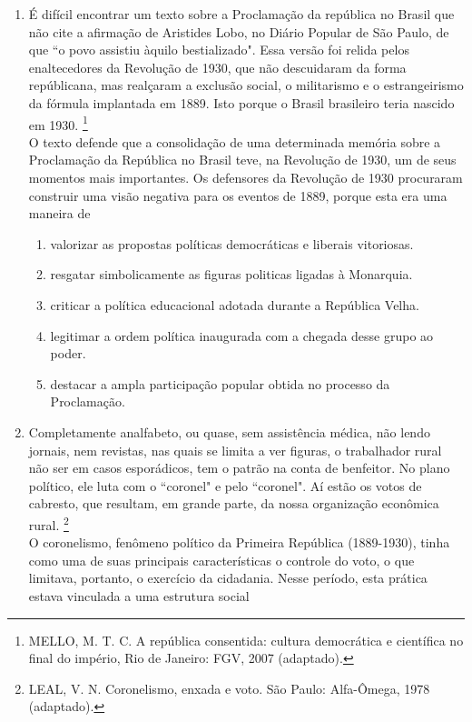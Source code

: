 \documentclass[10pt,a4paper]{article}
\begin{document}
\begin{multicols}{2}
\begin{enumerate}
	\item \'E dif\'icil encontrar um texto sobre a Proclama\c{c}\~ao  da rep\'ublica no Brasil que n\~ao cite a afirma\c{c}\~ao de Aristides Lobo, no Di\'ario Popular de S\~ao Paulo, de que ``o povo assistiu \`aquilo bestializado". Essa vers\~ao foi relida pelos enaltecedores da Revolu\c{c}\~ao de 1930, que n\~ao descuidaram da forma rep\'ublicana, mas real\c{c}aram a exclus\~ao social, o militarismo e o estrangeirismo da f\'ormula implantada em 1889. Isto porque o Brasil brasileiro teria nascido em 1930. \footnote{MELLO, M. T. C. A rep\'ublica consentida: cultura democr\'atica e cient\'ifica no final do imp\'erio, Rio de Janeiro: FGV, 2007 (adaptado).} \\
	O texto defende que a consolida\c{c}\~ao de uma determinada mem\'oria sobre a Proclama\c{c}\~ao da Rep\'ublica no Brasil teve, na Revolu\c{c}\~ao de 1930, um de seus momentos mais importantes. Os defensores da Revolu\c{c}\~ao de 1930 procuraram construir uma vis\~ao negativa para os eventos de 1889, porque esta era uma maneira de
		\begin{enumerate}
		\item valorizar as propostas pol\'iticas democr\'aticas e liberais vitoriosas.
		\item resgatar simbolicamente as figuras politicas ligadas \`a Monarquia.
		\item criticar a pol\'itica educacional adotada durante a Rep\'ublica Velha.
		\item legitimar a ordem pol\'itica inaugurada com a chegada desse grupo ao poder.
		\item destacar a ampla participa\c{c}\~ao popular obtida no processo da Proclama\c{c}\~ao.
		\end{enumerate}

	\item Completamente analfabeto, ou quase, sem assist\^encia m\'edica, n\~ao lendo jornais, nem revistas,
 nas quais se limita a ver figuras, o trabalhador rural n\~ao ser em casos espor\'adicos, tem o patr\~ao na conta 
de benfeitor. No plano pol\'itico, ele luta com o ``coronel" e pelo ``coronel". A\'i est\~ao os votos de cabresto, que resultam, em grande parte, da nossa organiza\c{c}\~ao econ\^omica rural. \footnote{LEAL, V. N. Coronelismo, enxada e voto. S\~ao Paulo: Alfa-Ômega, 1978 (adaptado).} \\
	O coronelismo, fen\^omeno pol\'itico da Primeira Rep\'ublica (1889-1930), tinha como uma de suas principais caracter\'isticas o controle do voto, o que limitava, portanto, o exerc\'icio da cidadania. Nesse per\'iodo, esta pr\'atica estava vinculada a uma estrutura social


\end{enumerate}
\end{multicols}
\end{document}
